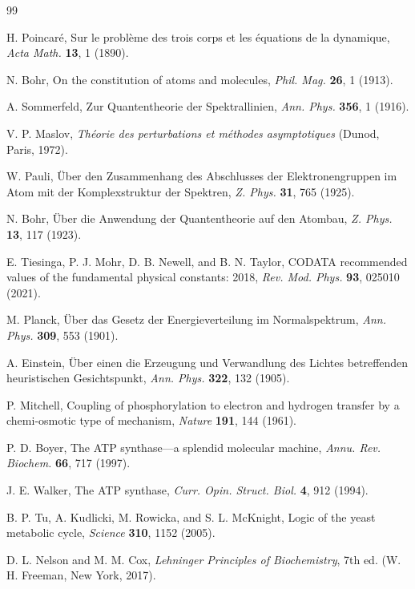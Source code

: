 \documentclass[aps,prd,twocolumn,superscriptaddress,floatfix,nofootinbib]{revtex4-2}
\theoremstyle{remark}
\begin{document}
\begin{thebibliography}{99}

H. Poincar\'{e}, Sur le probl\`{e}me des trois corps et les \'{e}quations de la dynamique, \textit{Acta Math.} \textbf{13}, 1 (1890).

N. Bohr, On the constitution of atoms and molecules, \textit{Phil. Mag.} \textbf{26}, 1 (1913).

A. Sommerfeld, Zur Quantentheorie der Spektrallinien, \textit{Ann. Phys.} \textbf{356}, 1 (1916).

V. P. Maslov, \textit{Th\'{e}orie des perturbations et m\'{e}thodes asymptotiques} (Dunod, Paris, 1972).

W. Pauli, \"{U}ber den Zusammenhang des Abschlusses der Elektronengruppen im Atom mit der Komplexstruktur der Spektren, \textit{Z. Phys.} \textbf{31}, 765 (1925).

N. Bohr, \"{U}ber die Anwendung der Quantentheorie auf den Atombau, \textit{Z. Phys.} \textbf{13}, 117 (1923).

E. Tiesinga, P. J. Mohr, D. B. Newell, and B. N. Taylor, CODATA recommended values of the fundamental physical constants: 2018, \textit{Rev. Mod. Phys.} \textbf{93}, 025010 (2021).

M. Planck, \"{U}ber das Gesetz der Energieverteilung im Normalspektrum, \textit{Ann. Phys.} \textbf{309}, 553 (1901).

A. Einstein, \"{U}ber einen die Erzeugung und Verwandlung des Lichtes betreffenden heuristischen Gesichtspunkt, \textit{Ann. Phys.} \textbf{322}, 132 (1905).

P. Mitchell, Coupling of phosphorylation to electron and hydrogen transfer by a chemi-osmotic type of mechanism, \textit{Nature} \textbf{191}, 144 (1961).

P. D. Boyer, The ATP synthase---a splendid molecular machine, \textit{Annu. Rev. Biochem.} \textbf{66}, 717 (1997).

J. E. Walker, The ATP synthase, \textit{Curr. Opin. Struct. Biol.} \textbf{4}, 912 (1994).

B. P. Tu, A. Kudlicki, M. Rowicka, and S. L. McKnight, Logic of the yeast metabolic cycle, \textit{Science} \textbf{310}, 1152 (2005).

D. L. Nelson and M. M. Cox, \textit{Lehninger Principles of Biochemistry}, 7th ed. (W. H. Freeman, New York, 2017).


\end{thebibliography}
\end{document}
